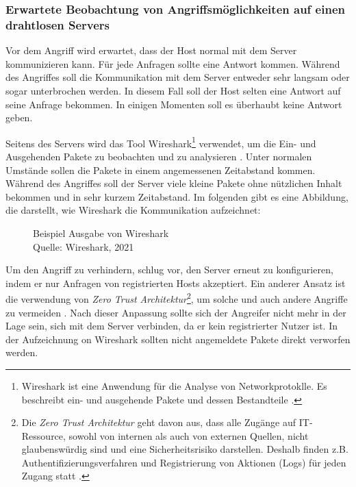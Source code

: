 \subsubsection{Erwartete Beobachtung von Angriffsmöglichkeiten auf einen drahtlosen Servers}
Vor dem Angriff wird erwartet, dass der Host normal mit dem Server kommunizieren kann. Für jede Anfragen sollte eine
Antwort kommen. Während des Angriffes soll die Kommunikation mit dem Server entweder sehr langsam oder sogar unterbrochen 
werden. In diesem Fall soll der Host selten eine Antwort auf seine Anfrage bekommen. In einigen Momenten soll es überhaubt 
keine Antwort geben. 

Seitens des Servers wird das Tool Wireshark\footnote{Wireshark ist eine Anwendung für die Analyse von Networkprotoklle.
Es beschreibt ein- und ausgehende Pakete und dessen Bestandteile \cite{refst:wisa}.} verwendet, um die Ein- und Ausgehenden
Pakete zu beobachten und zu analysieren \cite{refart:UBEC}. Unter normalen Umstände sollen die Pakete in einem angemessenen
Zeitabstand kommen. Während des Angriffes soll der Server viele kleine Pakete ohne nützlichen Inhalt bekommen und in sehr 
kurzem Zeitabstand. Im folgenden gibt es eine Abbildung, die darstellt, wie Wireshark die Kommunikation aufzeichnet:

\begin{figure}[H]
  \caption{Beispiel Ausgabe von Wireshark \\Quelle: Wireshark, 2021}
  \label{fig:refst_wisa}
\end{figure}

Um den Angriff zu verhindern, schlug \cite{refip:NYRS} vor, den Server erneut zu konfigurieren, indem er nur Anfragen von
registrierten Hosts akzeptiert. Ein anderer Ansatz ist die verwendung von \textit{Zero Trust Architektur}\footnote{Die 
\textit{Zero Trust Architektur} geht davon aus, dass alle Zugänge auf IT-Ressource, sowohl von internen als auch von
externen Quellen, nicht glaubenswürdig sind und eine Sicherheitsrisiko darstellen. Deshalb finden z.B. Authentifizierungsverfahren
und Registrierung von Aktionen (Logs) für jeden Zugang statt \cite{refart:EBZT}.}, um solche und auch andere Angriffe 
zu vermeiden \cite{refip:LYSP}.  Nach dieser Anpassung sollte sich der Angreifer nicht mehr in der Lage sein, sich mit dem Server
verbinden, da er kein registrierter Nutzer ist. In der Aufzeichnung on Wireshark sollten nicht angemeldete Pakete direkt
verworfen werden.


